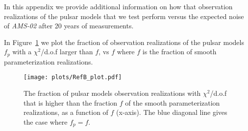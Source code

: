 \documentclass[aps,prd,twocolumn,amsmath,superscriptaddress,amssymb,showpacs,floatfix,nofootinbib]{revtex4-1}
\begin{document}
\begin{appendix}
In this appendix we provide additional information on how that observation 
realizations of the pulsar models that we test perform versus the expected 
noise of \textit{AMS-02} after 20 years of measurements. 

In Figure~\ref{fig:Pulsar_frac_vs_Noise_frac} we plot the fraction of 
observation realizations of the pulsar models  $f_{p}$ with a 
$\chi^{2}$/d.o.f  larger than $f$, vs $f$ where $f$ is the fraction 
of smooth parameterization realizations.
\begin{figure}
\begin{centering}
\hspace{-0.2cm}
\texttt{[image: plots/RefB\_plot.pdf]}
\end{centering}
\vspace{-0.5cm}
\caption{The fraction of pulsar models observation realizations with $\chi^{2}$/d.o.f 
that is higher than the fraction $f$ of the smooth parameterization realizations, as a
function of $f$ (x-axis). The blue diagonal line gives the case where $f_{p} = f$.}
\vspace{-0.4cm}
\label{fig:Pulsar_frac_vs_Noise_frac}
\end{figure}

\end{appendix}
\end{document}
